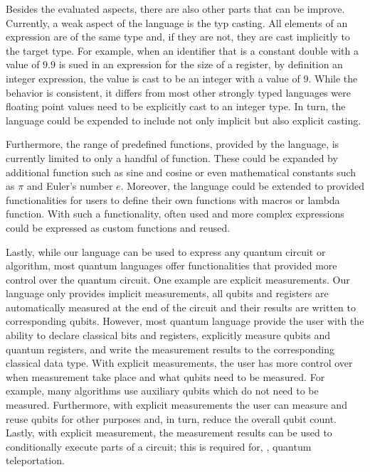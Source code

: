 Besides the evaluated aspects, there are also other parts that can be improve. Currently, a weak aspect of the language is the typ casting. All elements of an expression are of the same type and, if they are not, they are cast implicitly to the target type. For example, when an identifier that is a constant double with a value of $9.9$ is sued in an expression for the size of a register, by definition an integer expression, the value is cast to be an integer with a value of $9$. While the behavior is consistent, it differs from most other strongly typed languages were floating point values need to be explicitly cast to an integer type. In turn, the language could be expended to include not only implicit but also explicit casting.     

Furthermore, the range of predefined functions, provided by the language, is currently limited to only a handful of function. These could be expanded by additional function such as sine and cosine or even mathematical constants such as $\pi$ and Euler's number $e$. Moreover, the language could be extended to provided functionalities for users to define their own functions with macros or lambda function. With such a functionality, often used and more complex expressions could be expressed as custom functions and reused.

Lastly, while our language can be used to express any quantum circuit or algorithm, most quantum languages offer functionalities that provided more control over the quantum circuit. One example are explicit measurements. Our language only provides implicit measurements, \ie all qubits and registers are automatically measured at the end of the circuit and their results are written to corresponding qubits. However, most quantum language provide the user with the ability to declare classical bits and registers, explicitly measure qubits and quantum registers, and write the measurement results to the corresponding classical data type. With explicit measurements, the user has more control over when measurement take place and what qubits need to be measured. For example, many algorithms use auxiliary qubits which do not need to be measured. Furthermore, with explicit measurements the user can measure and reuse qubits for other purposes and, in turn, reduce the overall qubit count. Lastly, with explicit measurement, the measurement results can be used to conditionally execute parts of a circuit; this is required for, \eg, quantum teleportation.